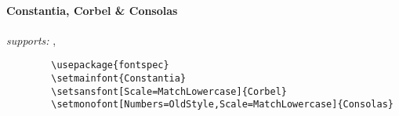 \documentclass[11pt]{ltxdoc}
\begin{document}
	\paragraph*{Constantia, Corbel \& Consolas} \hfill
	\textit{supports:} ,  \nopagebreak\vspace{-.75em}
	\begin{verbatim}
		\usepackage{fontspec}
		\setmainfont{Constantia}
		\setsansfont[Scale=MatchLowercase]{Corbel}
		\setmonofont[Numbers=OldStyle,Scale=MatchLowercase]{Consolas}
	\end{verbatim}
	
	
	\justifying
	\vfill
	\thispagestyle{empty}
	\listoffigures
\end{document}
